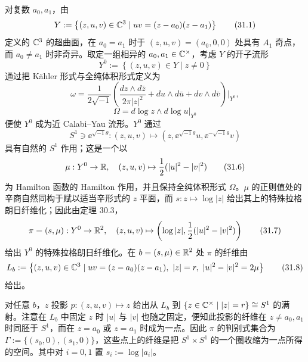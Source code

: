 对复数 $a_0, a_1$，由
\begin{equation}
Y := \left\{(z,u,v) \in \mathbb{C}^3 \mid uv = (z-a_0)(z-a_1)\right\} \tag{31.1}
\end{equation}
定义的 $\mathbb{C}^3$ 的超曲面，在 $a_0 = a_1$ 时于 $(z,u,v) = (a_0,0,0)$ 处具有 $A_1$ 奇点，而 $a_0 \ne a_1$ 时非奇异。取定一组相异的 $a_0, a_1 \in \mathbb{C}^{\times}$，考虑 $Y$ 的开子流形
\begin{equation}
Y^0 := \left\{(z,u,v) \in Y \mid z \ne 0\right\} \tag{31.2}
\end{equation}
通过把 Kähler 形式与全纯体积形式定义为
\begin{equation}
\omega = \frac{1}{2\sqrt{-1}}\left(\frac{dz \wedge d\bar z}{2\pi|z|^{2}} + du \wedge d\bar u + dv \wedge d\bar v\right)\bigg|_{Y^0}, \tag{31.3}
\end{equation}
\begin{equation}
\Omega = d\log z \wedge d\log u\bigg|_{Y^0} \tag{31.4}
\end{equation}
便使 $Y^0$ 成为近 Calabi--Yau 流形。$Y^0$ 通过
\begin{equation}
S^1 \ni \ee^{\sqrt{-1}\theta} : (z,u,v) \mapsto \left(z, \ee^{\sqrt{-1}\theta}u, \ee^{-\sqrt{-1}\theta}v\right) \tag{31.5}
\end{equation}
具有自然的 $S^1$ 作用；这是一个以
\begin{equation}
\mu : Y^0 \to \mathbb{R},\quad (z,u,v) \mapsto \frac{1}{2}(|u|^2 - |v|^2) \tag{31.6}
\end{equation}
为 Hamilton 函数的 Hamilton 作用，并且保持全纯体积形式 $\Omega$。$\mu$ 的正则值处的辛商自然同构于赋以适当辛形式的 $z$ 平面，而 $s: z \mapsto \log|z|$ 给出其上的特殊拉格朗日纤维化；因此由定理 30.3，
\begin{equation}
\pi = (s,\mu) : Y^0 \to \mathbb{R}^2,\quad (z,u,v) \mapsto \left(\log|z|, \frac{1}{2}(|u|^2 - |v|^2)\right) \tag{31.7}
\end{equation}
给出 $Y^0$ 的特殊拉格朗日纤维化。在 $b = (s,\mu) \in \mathbb{R}^2$ 处 $\pi$ 的纤维由
\begin{equation}
L_b := \left\{(z,u,v) \in \mathbb{C}^3 \mid uv = (z-a_0)(z-a_1),\ |z| = r,\ |u|^2 - |v|^2 = 2\mu\right\} \tag{31.8}
\end{equation}
给出。

对任意 $b$，$z$ 投影 $p: (z,u,v) \mapsto z$ 给出从 $L_b$ 到 $\{z \in \mathbb{C}^\times \mid |z| = r\} \cong S^1$ 的满射。注意在 $L_b$ 中固定 $z$ 时 $|u|$ 与 $|v|$ 也随之固定，便知此投影的纤维在 $z \ne a_0, a_1$ 时同胚于 $S^1$，而在 $z = a_0$ 或 $z = a_1$ 时成为一点。因此 $\pi$ 的判别式集合为 $\Gamma := \{(s_0,0),(s_1,0)\}$，这些点上的纤维是把 $S^1 \times S^1$ 的一个圈收缩为一点所得的空间。其中对 $i = 0,1$ 置 $s_i := \log|a_i|$。


